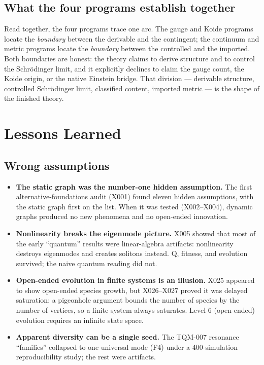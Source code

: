 \documentclass[10pt,twoside,openany]{book}
\begin{document}
\section{What the four programs establish together}

Read together, the four programs trace one arc. The gauge and Koide programs locate the
\emph{boundary} between the derivable and the contingent; the continuum and metric
programs locate the \emph{boundary} between the controlled and the imported. Both
boundaries are honest: the theory claims to derive structure and to control the
Schr\"odinger limit, and it explicitly declines to claim the gauge count, the Koide
origin, or the native Einstein bridge. That division --- derivable structure, controlled
Schr\"odinger limit, classified content, imported metric --- is the shape of the finished
theory.

\chapter{Lessons Learned}
\label{ch:lessons}

\section{Wrong assumptions}

\begin{itemize}
\item \textbf{The static graph was the number-one hidden assumption.} The first
alternative-foundations audit (X001) found eleven hidden assumptions, with the static
graph first on the list. When it was tested (X002--X004), dynamic graphs produced no new
phenomena and no open-ended innovation.
\item \textbf{Nonlinearity breaks the eigenmode picture.} X005 showed that most of the
early ``quantum'' results were linear-algebra artifacts: nonlinearity destroys eigenmodes
and creates solitons instead. Q, fitness, and evolution survived; the naive quantum
reading did not.
\item \textbf{Open-ended evolution in finite systems is an illusion.} X025 appeared to
show open-ended species growth, but X026--X027 proved it was delayed saturation: a
pigeonhole argument bounds the number of species by the number of vertices, so a finite
system always saturates. Level-6 (open-ended) evolution requires an infinite state space.
\item \textbf{Apparent diversity can be a single seed.} The TQM-007 resonance ``families''
collapsed to one universal mode (F4) under a 400-simulation reproducibility study; the
rest were artifacts.
\end{itemize}
\end{document}
